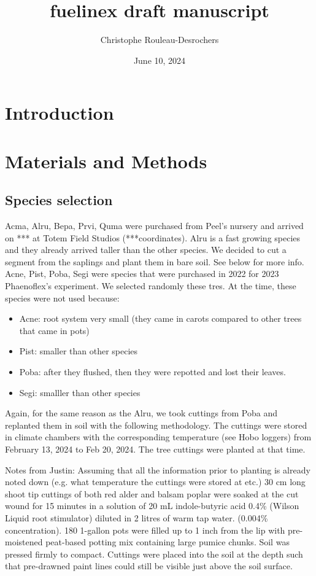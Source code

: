 \documentclass{article}
\title{fuelinex draft manuscript}
\author[1*$\dag$]{Christophe Rouleau-Desrochers}
\affil[1]{UBC}
\date{June 10, 2024}
\begin{document}
\maketitle

\begin{abstract}
\end{abstract}

\section{Introduction}

\section{Materials and Methods}
\subsection{Species selection}
Acma, Alru, Bepa, Prvi, Quma were purchased from Peel's nursery and arrived on *** at Totem Field Studios (***coordinates). Alru is a fast growing species and they already arrived taller than the other species. We decided to cut a segment from the saplings and plant them in bare soil. See below for more info. 
Acne, Pist, Poba, Segi were species that were purchased in 2022 for 2023 Phaenoflex's experiment. We selected randomly these tres. At the time, these species were not used because:
\begin{itemize}
	\item Acne: root system very small (they came in carots compared to other trees that came in pots)
	\item Pist: smaller than other species
	\item Poba: after they flushed, then they were repotted and lost their leaves.
	\item Segi: smalller than other species
\end{itemize}
Again, for the same reason as the Alru, we took cuttings from Poba and replanted them in soil with the following methodology. The cuttings were stored in climate chambers with the corresponding temperature (see Hobo loggers) from February 13, 2024 to Feb 20, 2024. The tree cuttings were planted at that time. 
\par Notes from Justin: Assuming that all the information prior to planting is already noted down (e.g. what temperature the cuttings were stored at etc.)
30 cm long shoot tip cuttings of both red alder and balsam poplar were soaked at the cut wound for 15 minutes in a solution of 20 mL indole-butyric acid 0.4\% (Wilson Liquid root stimulator) diluted in 2 litres of warm tap water. (0.004\% concentration). 180 1-gallon pots were filled up to 1 inch from the lip with pre-moistened peat-based potting mix containing large pumice chunks. Soil was pressed firmly to compact. Cuttings were placed into the soil at the depth such that pre-drawned paint lines could still be visible just above the soil surface. 
\end{document}
